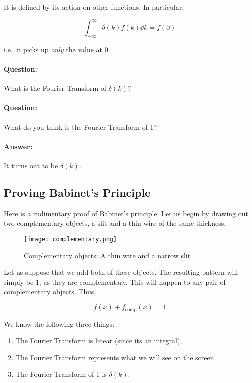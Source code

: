It is defined by its action on other functions. In particular,

\begin{equation*}
\int_{-\infty}^\infty \delta(k) f(k) \dd k = f(0)
\end{equation*}

i.e.\ it picks up \textit{only} the value at 0.

\begin{tcolorbox}
\paragraph{Question: } What is the Fourier Transform of $\delta(k)$?

\paragraph{Question: } What do you think is the Fourier Transform of 1?
\paragraph{Answer: } It turns out to be $\delta(k)$.
\end{tcolorbox}


\subsection{Proving Babinet's Principle}

Here is a rudimentary proof of Babinet's principle. Let us begin by drawing out two complementary objects, a slit and a thin wire of the same thickness.

\begin{figure}[!htb]
\centering
\texttt{[image: complementary.png]}
\caption{Complementary objects: A thin wire and a narrow slit}
\label{img_complementary}
\end{figure}

Let us suppose that we add both of these objects. The resulting pattern will simply be 1, as they are complementary. This will happen to any pair of complementary objects. Thus,

\begin{equation*}
f(x) + f_\text{comp}(x) = 1
\end{equation*}

We know the following three things:

\begin{enumerate}
\item The Fourier Transform is linear (since its an integral),
\item The Fourier Transform represents what we will see on the screen.
\item The Fourier Transform of 1 is $\delta(k)$.
\end{enumerate}

